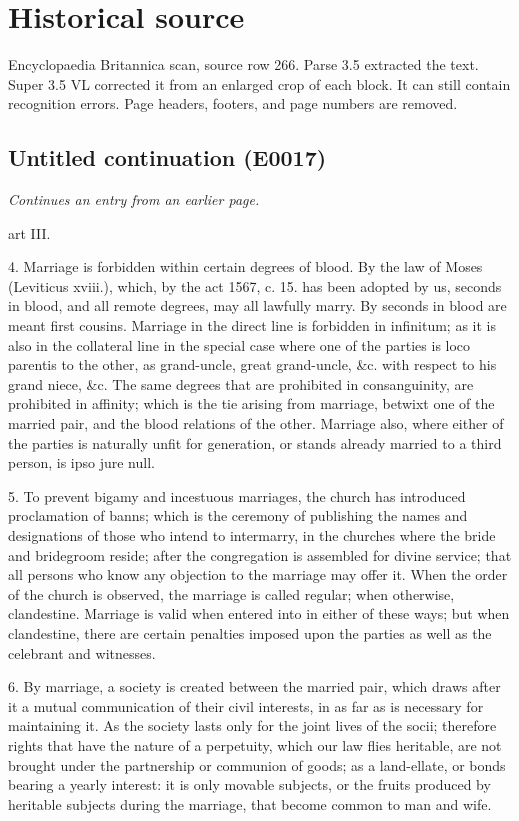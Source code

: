\documentclass{article}
\begin{document}
\section*{Historical source}
Encyclopaedia Britannica scan, source row 266. Parse 3.5 extracted the text. Super 3.5 VL corrected it from an enlarged crop of each block. It can still contain recognition errors.
Page headers, footers, and page numbers are removed.

\subsection*{Untitled continuation (E0017)}
\textit{Continues an entry from an earlier page.}

art III.

4. Marriage is forbidden within certain degrees of blood. By the law of Moses (Leviticus xviii.), which, by the act 1567, c. 15. has been adopted by us, seconds in blood, and all remote degrees, may all lawfully marry. By seconds in blood are meant first cousins. Marriage in the direct line is forbidden in infinitum; as it is also in the collateral line in the special case where one of the parties is loco parentis to the other, as grand-uncle, great grand-uncle, \&c. with respect to his grand niece, \&c. The same degrees that are prohibited in consanguinity, are prohibited in affinity; which is the tie arising from marriage, betwixt one of the married pair, and the blood relations of the other. Marriage also, where either of the parties is naturally unfit for generation, or stands already married to a third person, is ipso jure null.

5. To prevent bigamy and incestuous marriages, the church has introduced proclamation of banns; which is the ceremony of publishing the names and designations of those who intend to intermarry, in the churches where the bride and bridegroom reside; after the congregation is assembled for divine service; that all persons who know any objection to the marriage may offer it. When the order of the church is observed, the marriage is called regular; when otherwise, clandestine. Marriage is valid when entered into in either of these ways; but when clandestine, there are certain penalties imposed upon the parties as well as the celebrant and witnesses.

6. By marriage, a society is created between the married pair, which draws after it a mutual communication of their civil interests, in as far as is necessary for maintaining it. As the society lasts only for the joint lives of the socii; therefore rights that have the nature of a perpetuity, which our law flies heritable, are not brought under the partnership or communion of goods; as a land-ellate, or bonds bearing a yearly interest: it is only movable subjects, or the fruits produced by heritable subjects during the marriage, that become common to man and wife.
\end{document}
